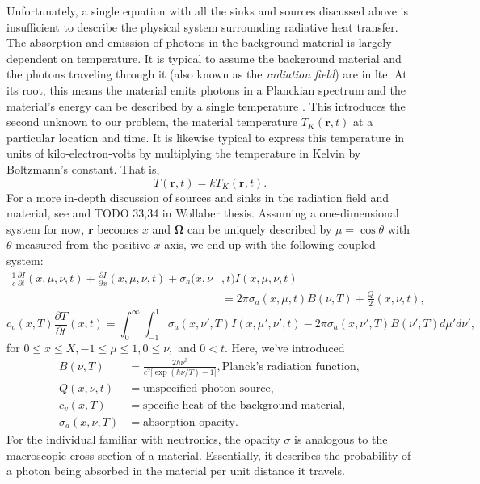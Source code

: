 Unfortunately, a single equation with all the sinks and sources discussed above is insufficient to describe the physical system surrounding radiative heat transfer.  The absorption and emission of photons in the background material is largely dependent on temperature.  It is typical to assume the background material and the photons traveling through it (also known as the \emph{radiation field}) are in \gls{lte}.  At its root, this means the material emits photons in a Planckian spectrum and the material's energy can be described by a single temperature \cite{wol_thesis}.  This introduces the second unknown to our problem, the material temperature $T_K(\mathbf{r},t)$ at a particular location and time.  It is likewise typical to express this temperature in units of kilo-electron-volts by multiplying the temperature in Kelvin by Boltzmann's constant.  That is,
\begin{equation}
T(\mathbf{r},t)=kT_K(\mathbf{r},t).
\end{equation}
\indent For a more in-depth discussion of sources and sinks in the radiation field and material, see \cite{pomraming} and TODO 33,34 in Wollaber thesis.  Assuming a one-dimensional system for now, $\mathbf{r}$ becomes $x$ and $\mathbf{\Omega}$ can be uniquely described by $\mu=\cos\theta$ with $\theta$ measured from the positive $x$-axis, we end up with the following coupled system:
\begin{align}\label{eqn_basic_rad}
\frac{1}{c}\frac{\partial I}{\partial t}(x,\mu,\nu,t) + \frac{\partial I}{\partial x}(x,\mu,\nu,t) +
        \sigma_a(x,\nu&,t)I(x,\mu,\nu,t) \nonumber\\
    &=2\pi\sigma_a(x,\mu,t)B(\nu,T) + \frac{Q}{2}(x,\nu,t),
\end{align}
\begin{equation}\label{eqn_basic_mat}
c_v(x,T)\frac{\partial T}{\partial t}(x,t)=
        \int_0^\infty\int_{-1}^1\sigma_a(x,\nu',T)I(x,\mu',\nu',t)
            -2\pi\sigma_a(x,\nu',T)B(\nu',T)d\mu'd\nu',
\end{equation}
for $0\leq x\leq X,-1\leq\mu\leq1,0\leq\nu,$ and $0<t$.  Here, we've introduced
\begin{align}
B(\nu,T)&=\frac{2h\nu^3}{c^2\big[\exp(h\nu/T)-1\big]},\mbox{Planck's radiation function},\\
Q(x,\nu,t)&=\mbox{unspecified photon source},\\
c_v(x,T)&=\mbox{specific heat of the background material},\\
\sigma_a(x,\nu,T)&=\mbox{absorption opacity}.
\end{align}
For the individual familiar with neutronics, the opacity $\sigma$ is analogous to the macroscopic cross section of a material.  Essentially, it describes the probability of a photon being absorbed in the material per unit distance it travels.

